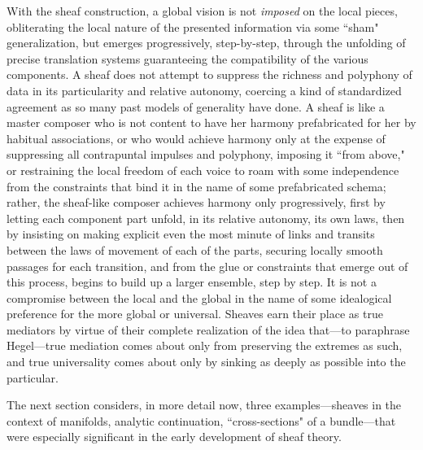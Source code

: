 \documentclass[11pt]{book}
\theoremstyle{definition}
\theoremstyle{definition}
\theoremstyle{definition}
\theoremstyle{theorem}
\theoremstyle{definition}
\begin{document}
With the sheaf construction, a global vision is not \textit{imposed} on the local pieces, obliterating the local nature of the presented information via some ``sham" generalization, but emerges progressively, step-by-step, through the unfolding of precise translation systems guaranteeing the compatibility of the various components. A sheaf does not attempt to suppress the richness and polyphony of data in its particularity and relative autonomy, coercing a kind of standardized agreement as so many past models of generality have done. A sheaf is like a master composer who is not content to have her harmony prefabricated for her by habitual associations, or who would achieve harmony only at the expense of suppressing all contrapuntal impulses and polyphony, imposing it ``from above," or restraining the local freedom of each voice to roam with some independence from the constraints that bind it in the name of some prefabricated schema; rather, the sheaf-like composer achieves harmony only progressively, first by letting each component part unfold, in its relative autonomy, its own laws, then by insisting on making explicit even the most minute of links and transits between the laws of movement of each of the parts, securing locally smooth passages for each transition, and from the glue or constraints that emerge out of this process, begins to build up a larger ensemble, step by step. It is not a compromise between the local and the global in the name of some idealogical preference for the more global or universal. Sheaves earn their place as true mediators by virtue of their complete realization of the idea that---to paraphrase Hegel---true mediation comes about only from preserving the extremes as such, and true universality comes about only by sinking as deeply as possible into the particular. \par    
The next section considers, in more detail now, three examples---sheaves in the context of manifolds, analytic continuation, ``cross-sections" of a bundle---that were especially significant in the early development of sheaf theory. 
\end{document}
